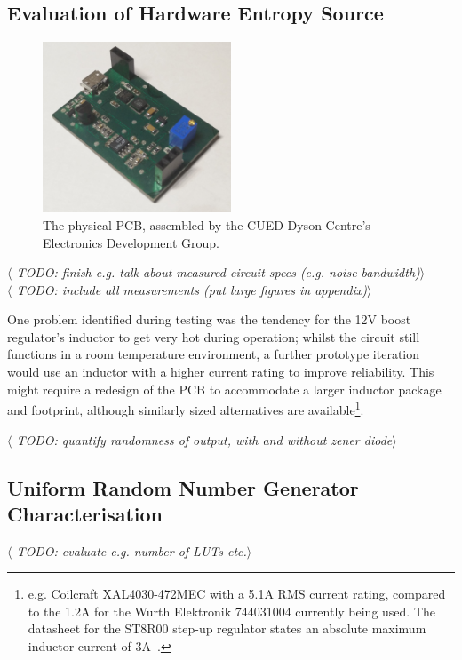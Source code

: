 \documentclass[12pt]{article}
\begin{document}
  \subsection{Evaluation of Hardware Entropy Source}
    \begin{figure}[H]
      \centering
      \includegraphics[width=0.5\textwidth]{fig/PCB_CROPPED.jpg}
      \caption{The physical PCB, assembled by the CUED Dyson Centre's Electronics Development Group.}
      \label{fig:pcb_cropped}
    \end{figure}

    \textit{$\langle$ TODO: finish e.g. talk about measured circuit specs (e.g. noise bandwidth)$\rangle$}\\
    \textit{$\langle$ TODO: include all measurements (put large figures in appendix)$\rangle$}

    One problem identified during testing was the tendency for the 12V boost regulator's inductor to get very hot during operation; whilst the circuit still functions in a room temperature environment, a further prototype iteration would use an inductor with a higher current rating to improve reliability. This might require a redesign of the PCB to accommodate a larger inductor package and footprint, although similarly sized alternatives are available\footnote{e.g. Coilcraft XAL4030-472MEC with a 5.1A RMS current rating, compared to the 1.2A for the Wurth Elektronik 744031004 currently being used. The datasheet for the ST8R00 step-up regulator states an absolute maximum inductor current of 3A~\cite{ST8R00}.}.

    \textit{$\langle$ TODO: quantify randomness of output, with and without zener diode$\rangle$}


  \subsection{Uniform Random Number Generator Characterisation}
    \textit{$\langle$ TODO: evaluate e.g. number of LUTs etc.$\rangle$}
\end{document}
